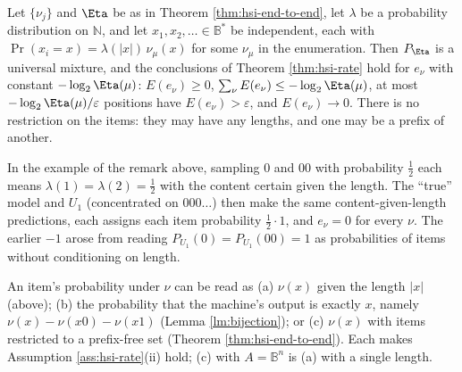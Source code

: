 \begin{theorem}
\label{thm:hsi-end-to-end-length}
Let $\{\nu_j\}$ and $\Eta$ be as in Theorem \ref{thm:hsi-end-to-end}, let $\lambda$ be a probability distribution on $\mathbb{N}$, and let $x_1,x_2,\dots\in\mathbb{B}^*$ be independent, each with $\Pr(x_i=x)=\lambda(|x|)\,\nu_\mu(x)$ for some $\nu_\mu$ in the enumeration. Then $P_\Eta$ is a universal mixture, and the conclusions of Theorem \ref{thm:hsi-rate} hold for $e_\nu$ with constant $-\log_2\Eta(\mu)$: $E(e_\nu)\ge 0$, $\sum_\nu E(e_\nu)\le-\log_2\Eta(\mu)$, at most $-\log_2\Eta(\mu)/\varepsilon$ positions have $E(e_\nu)>\varepsilon$, and $E(e_\nu)\to 0$. There is no restriction on the items: they may have any lengths, and one may be a prefix of another.
\end{theorem}

\begin{remark}[The example $A=\{0,00\}$ under this reading]
In the example of the remark above, sampling $0$ and $00$ with probability $\tfrac12$ each means $\lambda(1)=\lambda(2)=\tfrac12$ with the content certain given the length. The ``true'' model and $U_1$ (concentrated on $000\dots$) then make the same content-given-length predictions, each assigns each item probability $\tfrac12\cdot 1$, and $e_\nu=0$ for every $\nu$. The earlier $-1$ arose from reading $P_{U_1}(0)=P_{U_1}(00)=1$ as probabilities of items without conditioning on length.
\end{remark}

\begin{remark}[Three readings]
An item's probability under $\nu$ can be read as (a) $\nu(x)$ given the length $|x|$ (above); (b) the probability that the machine's output is exactly $x$, namely $\nu(x)-\nu(x0)-\nu(x1)$ (Lemma \ref{lm:bijection}); or (c) $\nu(x)$ with items restricted to a prefix-free set (Theorem \ref{thm:hsi-end-to-end}). Each makes Assumption \ref{ass:hsi-rate}(ii) hold; (c) with $A=\mathbb{B}^n$ is (a) with a single length.
\end{remark}

